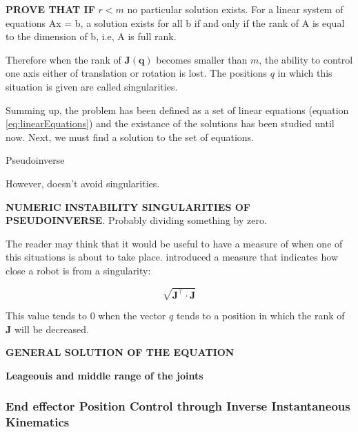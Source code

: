 \textbf{PROVE THAT IF} $r < m$ no particular solution exists.
For a linear system of equations Ax = b, a solution exists for all b if and only if the rank of A is equal to the dimension of b, i.e, A is full rank.

Therefore when the rank of ${\mathbf{J}(\mathbf{{q}})}$ becomes smaller than $m$, the ability to control one axis either of translation or rotation is lost. The positions $q$ in which this situation is given are called singularities.

Summing up, the problem has been defined as a set of linear equations (equation \ref{eq:linearEquations}) and the existance of the solutions has been studied until now. Next, we must find a solution to the set of equations.


Pseudoinverse

However, doesn't avoid singularities.

\textbf{NUMERIC INSTABILITY SINGULARITIES OF PSEUDOINVERSE}. Probably dividing something by zero.

The reader may think that it would be useful to have a measure of when one of this situations is about to take place. \cite{yoshikawa1985dynamic} introduced a measure that indicates how close a robot is from a singularity:

$$\sqrt{\mathbf{J^{\intercal}} \cdot \mathbf{J}}$$

This value tends to $0$ when the vector $q$ tends to a position in which the rank of $\mathbf{J}$ will be decreased.

\textbf{GENERAL SOLUTION OF THE EQUATION}

\textbf{Leageouis and middle range of the joints}


\subsubsection{End effector Position Control through Inverse Instantaneous Kinematics}
\label{sss:eepositioncontrol}



